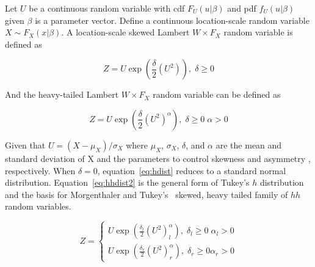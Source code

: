 \documentclass[12pt]{article}\usepackage[]{graphicx}\usepackage[]{color}
\theoremstyle{definition}
\begin{document}
Let $U$ be a continuous random variable with cdf $F_U(u|\beta)$ and pdf $f_U(u|\beta)$ given $\beta$ is a parameter vector. Define a continuous location-scale random variable $X\sim F_X(x|\beta)$. A location-scale skewed Lambert $W\times F_X$ random variable is defined as 

\begin{equation}
Z = U\exp \left(\frac{\delta}{2} (U^2)\right),\; \delta\ge 0
\label{eq:hdist}
\end{equation}

And the heavy-tailed Lambert $W\times F_X$ random variable can be defined as

\begin{equation}
Z = U\exp\left(\frac{\delta}{2}(U^2)^\alpha\right),\; \delta\ge 0\; \alpha > 0
\label{eq:hhdist2}
\end{equation}

Given that $U = (X-\mu_X)/\sigma_X$ where $\mu_X$, $\sigma_X$, $\delta$, and $\alpha$ are the mean and standard deviation of X and the parameters to control skewness and asymmetry , respectively. When $\delta = 0$, equation~\ref{eq:hdist} reduces to a standard normal distribution. Equation~\ref{eq:hhdist2} is the general form of Tukey's $h$ distribution~\cite{ghdist} and the basis for Morgenthaler and Tukey's~\cite{hhdist} skewed, heavy tailed family of $hh$ random variables.

\begin{equation}
  Z = \begin{cases}
               U\exp\left(\frac{\delta_l}{2}(U^2)^\alpha_l\right),\; \delta_l \ge 0\; \alpha_l > 0\\
               U\exp\left(\frac{\delta_r}{2}(U^2)^\alpha_r\right),\; \delta_r \ge 0 \alpha_r > 0
            \end{cases}
\end{equation}

\singlespacing
\end{document}
